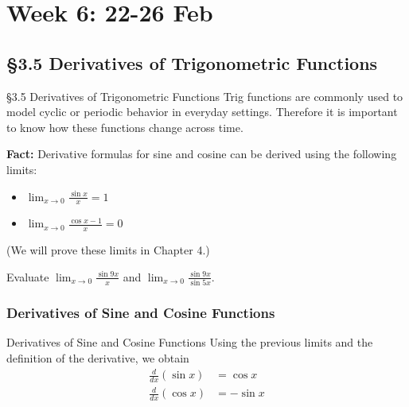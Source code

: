 \documentclass[cal1spr16Lectures.tex]{subfiles}
\begin{document}
\section[Week 6]{Week 6: 22-26 Feb}

\subsection[3.5 Derivatives of Trigonometric Functions]{\S 3.5 Derivatives of Trigonometric Functions}

\begin{frame}{\S 3.5 Derivatives of Trigonometric Functions}
Trig functions are commonly used to model cyclic or periodic behavior in everyday settings.  Therefore it is important to know how these functions change across time.
\end{frame}

\begin{frame}{}{}
{\bf Fact:} Derivative formulas for sine and cosine can be derived using the following limits:
\begin{itemize}
	\item $\lim_{x \to 0} \frac{\sin x}{x}=1$
	\item $\lim_{x \to 0} \frac{\cos x -1}{x}=0$
\end{itemize}
(We will prove these limits in Chapter 4.)
\end{frame}

\begin{frame}
\begin{exe} Evaluate $\displaystyle\lim_{x \to 0} \frac{\sin 9x}{x}$ and $\displaystyle\lim_{x \to 0} \frac{\sin 9x}{\sin 5x}.$ \end{exe}
\end{frame}

\subsubsection{Derivatives of Sine and Cosine Functions}

\begin{frame}{\small Derivatives of Sine and Cosine Functions}
Using the previous limits and the definition of the derivative, we obtain
\begin{align*}
\frac{d}{dx} (\sin x) &= \cos x \\
\frac{d}{dx} (\cos x) &= -\sin x
\end{align*}
\end{frame}
\end{document}
